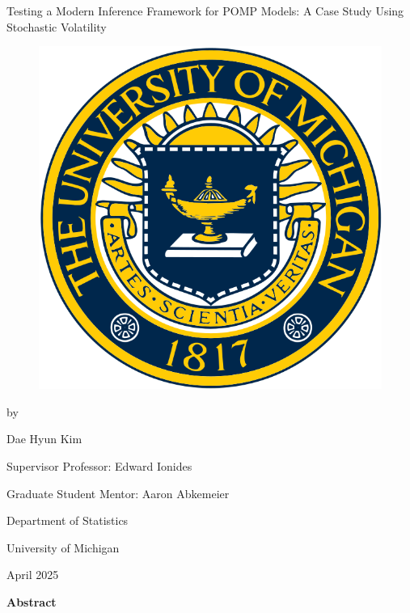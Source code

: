 \documentclass[11pt]{report}
\begin{document}
\newpage 
\begin{center}
\huge Testing a Modern Inference Framework for POMP Models: A Case Study Using Stochastic Volatility  
\par\vspace{1cm} %
\begin{figure}[ht]
\begin{center}
\includegraphics[width=.4\textwidth]{umichlogo.png}
\end{center}
\end{figure}
{\fontsize{16pt}{16pt}\selectfont by \par Dae Hyun Kim \par} %
\vspace{1.0cm}
\par\vspace{0.2cm}
{\fontsize{14pt}{14pt}\selectfont Supervisor Professor: Edward Ionides \par}
\vspace{0.1cm}
\par\vspace{0.2cm}
{\fontsize{14pt}{14pt}\selectfont Graduate Student Mentor: Aaron Abkemeier \par}
\vspace{0.7cm}
\vspace{10pt}
{\fontsize{16pt}{16pt}\selectfont Department of Statistics \par }  %
\vspace{1.5cm}
{\fontsize{16pt}{16pt} University of Michigan\par} 
\vspace{1cm}
{\fontsize{14pt}{14pt}\selectfont April 2025}
\end{center}

\newpage 
{} %
\begin{center}
\par\vspace{20pt}
\large \textbf{Abstract}
\end{center}
\end{document}

